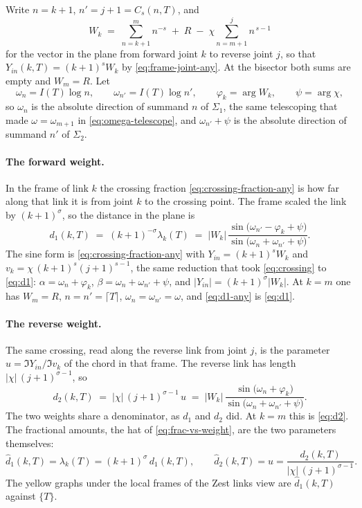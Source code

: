 \documentclass[11pt]{article}
\theoremstyle{definition}
\begin{document}
Write $n=k+1$, $n'=j+1=C_{s}(n,T)$, and
\begin{equation}\label{eq:W-any}
W_k
\;=\;
\sum_{n=k+1}^{m}n^{-s}
\;+\;R
\;-\;\chi\sum_{n=m+1}^{j}n^{\,s-1}
\end{equation}
for the vector in the plane from forward joint $k$ to reverse joint $j$, so
that $Y_{in}(k,T)=(k+1)^{s}W_k$ by \eqref{eq:frame-joint-any}. At the
bisector both sums are empty and $W_m=R$. Let
\begin{equation}\label{eq:omega-any}
\omega_n=I(T)\log n,
\qquad
\omega_{n'}=I(T)\log n',
\qquad
\varphi_k=\arg W_k,
\qquad
\psi=\arg\chi,
\end{equation}
so $\omega_n$ is the absolute direction of summand $n$ of $\Sigma_1$, the
same telescoping that made $\omega=\omega_{m+1}$ in \eqref{eq:omega-telescope},
and $\omega_{n'}+\psi$ is the absolute direction of summand $n'$ of
$\Sigma_2$.

\paragraph{The forward weight.} In the frame of link $k$ the crossing fraction
\eqref{eq:crossing-fraction-any} is how far along that link it is from joint
$k$ to the crossing point. The frame scaled the link by $(k+1)^{\sigma}$, so the distance
in the plane is
\begin{equation}\label{eq:d1-any}
d_1(k,T)
\;=\;
(k+1)^{-\sigma}\lambda_k(T)
\;=\;
|W_k|\,
\frac{\sin\!\bigl(\omega_{n'}-\varphi_k+\psi\bigr)}
     {\sin\!\bigl(\omega_n+\omega_{n'}+\psi\bigr)}.
\end{equation}
The sine form is \eqref{eq:crossing-fraction-any} with
$Y_{in}=(k+1)^{s}W_k$ and $v_k=\chi\,(k+1)^{s}(j+1)^{s-1}$, the same
reduction that took \eqref{eq:crossing} to \eqref{eq:d1}:
$\alpha=\omega_n+\varphi_k$, $\beta=\omega_n+\omega_{n'}+\psi$, and
$|Y_{in}|=(k+1)^{\sigma}|W_k|$. At $k=m$ one has $W_m=R$,
$n=n'=\lceil T\rceil$, $\omega_n=\omega_{n'}=\omega$, and
\eqref{eq:d1-any} is \eqref{eq:d1}.

\paragraph{The reverse weight.} The same crossing, read along the reverse
link from joint $j$, is the parameter
$u=\Im Y_{in}/\Im v_k$ of the chord in that frame. The reverse link has
length $|\chi|\,(j+1)^{\sigma-1}$, so
\begin{equation}\label{eq:d2-any}
d_2(k,T)
\;=\;
|\chi|\,(j+1)^{\sigma-1}\,u
\;=\;
|W_k|\,
\frac{\sin\!\bigl(\omega_n+\varphi_k\bigr)}
     {\sin\!\bigl(\omega_n+\omega_{n'}+\psi\bigr)}.
\end{equation}
The two weights share a denominator, as $d_1$ and $d_2$ did. At $k=m$ this
is \eqref{eq:d2}. The fractional amounts, the hat of
\eqref{eq:frac-vs-weight}, are the two parameters themselves:
\begin{equation}\label{eq:hat-any}
\hat d_1(k,T)=\lambda_k(T)=(k+1)^{\sigma}\,d_1(k,T),
\qquad
\hat d_2(k,T)=u=\frac{d_2(k,T)}{|\chi|\,(j+1)^{\sigma-1}}.
\end{equation}
The yellow graphs under the local frames of the Zest links view are
$\hat d_1(k,T)$ against $\{T\}$.
\end{document}
